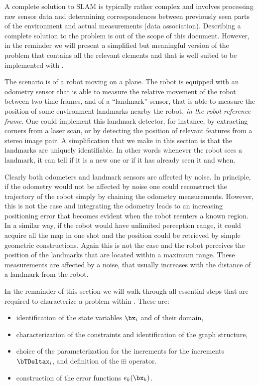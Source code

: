\documentclass[a4paper]{article}
\begin{document}
A complete solution to SLAM is typically rather complex and involves
processing raw sensor data and determining correspondences between
previously seen parts of the environment and actual measurements (data
association). Describing a complete solution to the problem is out of
the scope of this document.  However, in the reminder we will present a
simplified but meaningful version of the problem that contains all the relevant elements
and that is well suited to be implemented with \gopt.

The scenario is of a robot moving on a plane. The robot is equipped
with an odometry sensor that is able to measure the relative movement
of the robot between two time frames, and of a ``landmark'' sensor,
that is able to measure the position of some environment landmarks
nearby the robot, \emph{in the robot reference frame}. One could
implement this landmark detector, for instance, by extracting corners
from a laser scan, or by detecting the position of relevant features
from a stereo image pair. A simplification that we make in this
section is that the landmarks are uniquely identifiable. In other
words whenever the robot sees a landmark, it can tell if it is a new
one or if it has already seen it and when.

Clearly both odometers and landmark sensors are affected by noise.  In
principle, if the odometry would not be affected by noise one could
reconstruct the trajectory of the robot simply by chaining the
odometry measurements. However, this is not the case and integrating
the odometry leads to an increasing positioning error that becomes
evident when the robot reenters a known region. In a similar way,
if the robot would have unlimited perception range, it could acquire
all the map in one shot and the position could be retrieved by simple
geometric constructions. Again this is not the case and the robot
perceives the position of the landmarks that are located within a
maximum range. These measurements are affected by a noise, that
usually increases with the distance of a landmark from the robot.

In the remainder of this section we will walk through all essential
steps that are required to characterize a problem within \gopt{}.
These are:
\begin{itemize}
\item identification of the state variables $\bx_i$ and of their domain,
\item characterization of the constraints and identification of the graph structure,
\item choice of the parameterization for the increments for the increments $\bTDeltax_i$, and definition of the
$\boxplus$ operator.
\item construction of the error functions $e_k(\bx_k)$.
\end{itemize}
\end{document}

